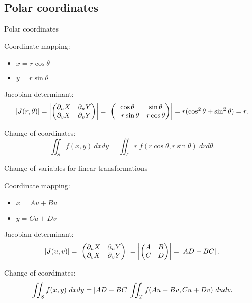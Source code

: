 \subsection{Polar coordinates}


{Polar coordinates}

Coordinate mapping:
\begin{itemize}
    \item  \(x = r \cos \theta\)
    \item  \(y = r \sin \theta\)
\end{itemize}

Jacobian determinant:
\[
    \left|J(r,\theta)\right|
    =
    \left|\begin{pmatrix}
            \partial_u X & \partial_u Y \\ \partial_v X & \partial_v Y
        \end{pmatrix}\right|
    =
    \left|\begin{pmatrix}
            \cos \theta & \sin \theta \\ -r\sin \theta & r\cos \theta
        \end{pmatrix}\right|
    = r ( \cos^2\theta + \sin^2 \theta) = r.
\]

Change of coordinates:
\[
    \iint_{S} f(x,y) \ dxdy = \iint_{T}  r  \ f(r\cos \theta, r\sin \theta)  \ drd\theta.
\]





{Change of variables for linear transformations}

Coordinate mapping:
\begin{itemize}
    \item \(x = Au + Bv\)
    \item \(y = Cu + Dv\)
\end{itemize}


Jacobian determinant:
\[
    \left|J(u,v)\right|
    =
    \left|\begin{pmatrix}
            \partial_u X & \partial_u Y \\ \partial_v X & \partial_v Y
        \end{pmatrix}\right|
    =
    \left|\begin{pmatrix}
            A & B \\ C & D
        \end{pmatrix}\right|
    = \left|AD - BC\right|.
\]

Change of coordinates:
\[
    \iint_{S} f(x,y) \ dxdy = \abs{AD - BC} \iint_{T}   f(Au + Bv,Cu + Dv)  \ dudv.
\]



